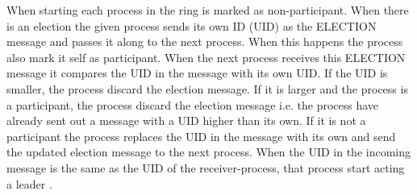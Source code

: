 \documentclass[Main]{subfiles}
\begin{document}
When starting each process in the ring is marked as non-participant.
When there is an election the given process sends its own ID (UID) as the ELECTION message and passes it along to the next process. When this happens the process also mark it self as participant. 
When the next process receives this ELECTION message it compares the UID in the message with its own UID. If the UID is smaller, the process discard the election message. If it is larger and the process is a participant, the process discard the election message i.e. the process have already sent out a message with a UID higher than its own. If it is not a participant the process replaces the UID in the message with its own and send the updated election message to the next process. 
When the UID in the incoming message is the same as the UID of the receiver-process, that process start acting a leader \cite{wiki-RingAlgorithm}.
\end{document}
